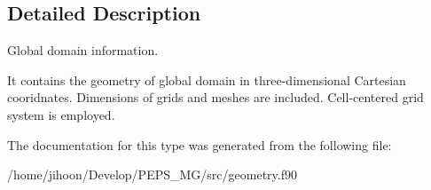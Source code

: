 \subsection{Detailed Description}
Global domain information. 

It contains the geometry of global domain in three-\/dimensional Cartesian cooridnates. Dimensions of grids and meshes are included. Cell-\/centered grid system is employed. 

The documentation for this type was generated from the following file\+:\begin{DoxyCompactItemize}
\item 
/home/jihoon/\+Develop/\+P\+E\+P\+S\+\_\+\+M\+G/src/geometry.\+f90\end{DoxyCompactItemize}
